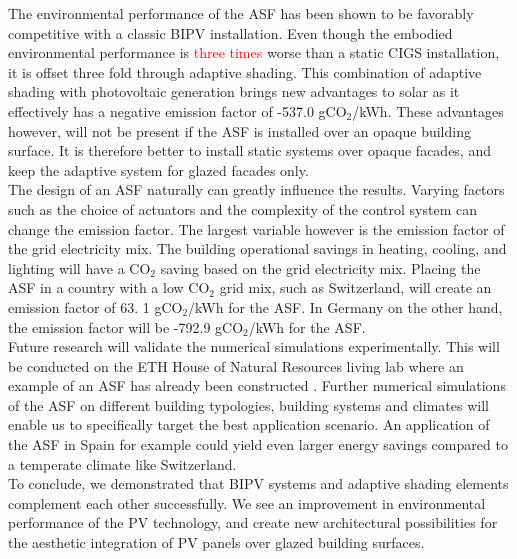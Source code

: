 
The environmental performance of the ASF has been shown to be favorably competitive with a classic BIPV installation. Even though the embodied environmental performance is \textcolor{red}{three times} worse than a static CIGS installation, it is offset three fold through adaptive shading. This combination of adaptive shading with photovoltaic generation brings new advantages to solar as it effectively has a negative emission factor of -537.0 gCO${_2}$/kWh. These advantages however, will not be present if the ASF is installed over an opaque building surface. It is therefore better to install static systems over opaque facades, and keep the adaptive system for glazed facades only.\\

The design of an ASF naturally can greatly influence the results. Varying factors such as the choice of actuators and the complexity of the control system can change the emission factor. The largest variable however is the emission factor of the grid electricity mix. The building operational savings in heating, cooling, and lighting will have a CO${_2}$ saving based on the grid electricity mix. Placing the ASF in a country with a low CO${_2}$ grid mix, such as Switzerland, will create an emission factor of 63. 1 gCO${_2}$/kWh for the ASF. In Germany on the other hand, the emission factor will be -792.9 gCO${_2}$/kWh for the ASF.\\

Future research will validate the numerical simulations experimentally. This will be conducted on the ETH House of Natural Resources living lab where an example of an ASF has already been constructed \cite{nagy2015frontiers}. Further numerical simulations of the ASF on different building typologies, building systems and climates will enable us to specifically target the best application scenario. An application of the ASF in Spain for example could yield even larger energy savings compared to a temperate climate like Switzerland.\\

To conclude, we demonstrated that BIPV systems and adaptive shading elements complement each other successfully. We see an improvement in environmental performance of the PV technology, and create new architectural possibilities for the aesthetic integration of PV panels over glazed building surfaces. 


